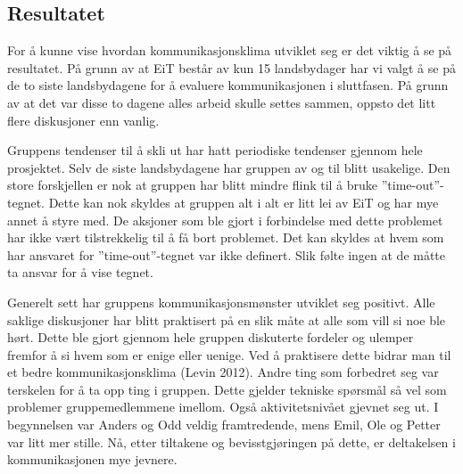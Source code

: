 \subsection{Resultatet}
For å kunne vise hvordan kommunikasjonsklima utviklet seg er det viktig å se på resultatet. 
På grunn av at EiT består av kun 15 landsbydager har vi valgt å se på de to siste landsbydagene for å evaluere kommunikasjonen i sluttfasen. 
På grunn av at det var disse to dagene alles arbeid skulle settes sammen, oppsto det litt flere diskusjoner enn vanlig. 
\vspace{\secspace}

Gruppens tendenser til å skli ut har hatt periodiske tendenser gjennom hele prosjektet. 
Selv de siste landsbydagene har gruppen av og til blitt usakelige. 
Den store forskjellen er nok at gruppen har blitt mindre flink til å bruke ''time-out''-tegnet. 
Dette kan nok skyldes at gruppen alt i alt er litt lei av EiT og har mye annet å styre med. 
De aksjoner som ble gjort i forbindelse med dette problemet har ikke vært tilstrekkelig til å få bort problemet. 
Det kan skyldes at hvem som har ansvaret for ''time-out''-tegnet var ikke definert.
Slik følte ingen at de måtte ta ansvar for å vise tegnet. 
\vspace{\secspace}

Generelt sett har gruppens kommunikasjonsmønster utviklet seg positivt. 
Alle saklige diskusjoner har blitt praktisert på en slik måte at alle som vill si noe ble hørt. 
Dette ble gjort gjennom hele gruppen diskuterte fordeler og ulemper fremfor å si hvem som er enige eller uenige. 
Ved å praktisere dette bidrar man til et bedre kommunikasjonsklima (Levin 2012).
Andre ting som forbedret seg var terskelen for å ta opp ting i gruppen. 
Dette gjelder tekniske spørsmål så vel som problemer gruppemedlemmene imellom. 
Også aktivitetsnivået gjevnet seg ut. 
I begynnelsen var Anders og Odd veldig framtredende, mens Emil, Ole og Petter var litt mer stille. 
Nå, etter tiltakene og bevisstgjøringen på dette, er deltakelsen i kommunikasjonen mye jevnere.  
\vspace{\secspace}
